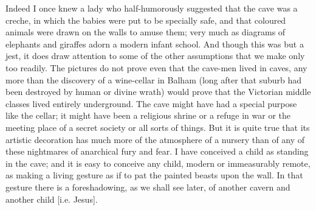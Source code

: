 Indeed I once knew a lady who half-humorously suggested that the cave was a creche, in which the babies were put to be specially safe, and that coloured animals were drawn on the walls to amuse them; very much as diagrams of elephants and giraffes adorn a modern infant school. And though this was but a jest, it does draw attention to some of the other assumptions that we make only too readily. The pictures do not prove even that the cave-men lived in caves, any more than the discovery of a wine-cellar in Balham (long after that suburb had been destroyed by human or divine wrath) would prove that the Victorian middle classes lived entirely underground. The cave might have had a special purpose like the cellar; it might have been a religious shrine or a refuge in war or the meeting place of a secret society or all sorts of things. But it is quite true that its artistic decoration has much more of the atmosphere of a nursery than of any of these nightmares of anarchical fury and fear. I have conceived a child as standing in the cave; and it is easy to conceive any child, modern or immeasurably remote, as making a living gesture as if to pat the painted beasts upon the wall. In that gesture there is a foreshadowing, as we shall see later, of another cavern and another child [i.e. Jesus].

